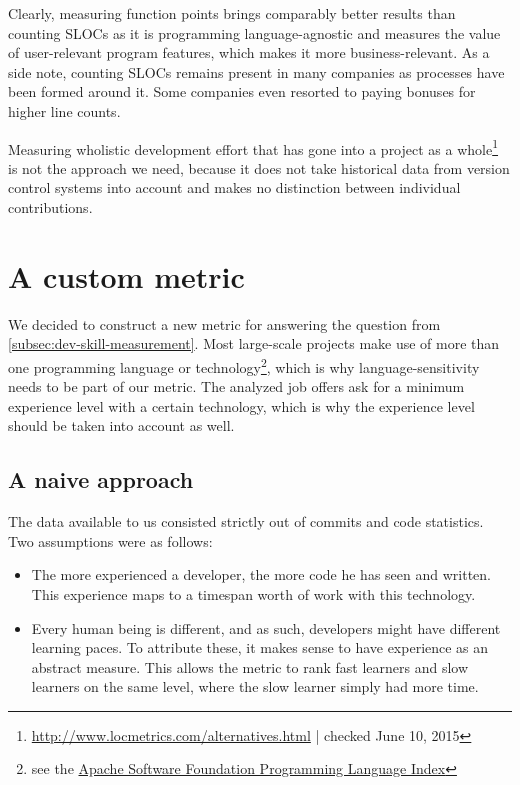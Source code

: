 Clearly, measuring function points brings comparably better results than counting SLOCs as it is programming language-agnostic and measures the value of user-relevant program features, which makes it more business-relevant. As a side note, counting SLOCs remains present in many companies as processes have been formed around it. Some companies even resorted to paying bonuses for higher line counts\cite{am:2009}.
\newline

Measuring wholistic development effort that has gone into a project as a whole\footnote{\url{http://www.locmetrics.com/alternatives.html} | checked June 10, 2015} is not the approach we need, because it does not take historical data from version control systems into account and makes no distinction between individual contributions.

\section{A custom metric}
We decided to construct a new metric for answering the question from \ref{subsec:dev-skill-measurement}. Most large-scale projects make use of more than one programming language or technology\footnote{see \eg the \href{http://projects.apache.org/indexes/language.html}{Apache Software Foundation Programming Language Index}}, which is why language-sensitivity needs to be part of our metric. The analyzed job offers ask for a minimum experience level with a certain technology, which is why the experience level should be taken into account  as well.

\subsection{A naive approach}
The data available to us consisted strictly out of commits and code statistics. Two assumptions were as follows:

\begin{itemize}
 \item The more experienced a developer, the more code he has seen and written. This experience maps to a timespan worth of work with this technology.
 \item Every human being is different, and as such, developers might have different learning paces. To attribute these, it makes sense to have experience as an abstract measure. This allows the metric to rank fast learners and slow learners on the same level, where the slow learner simply had more time.
\end{itemize}


